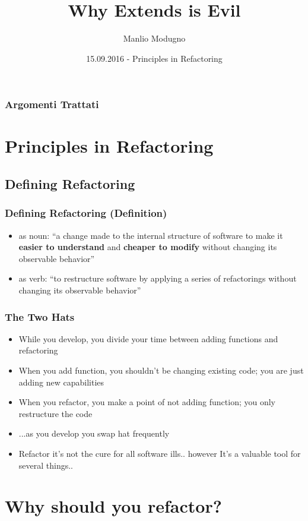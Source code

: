 \documentclass{beamer}
\title{Why Extends is Evil}
\author{Manlio Modugno}
\institute[GMTechnologies]
\date[15.09.2016] 
{15.09.2016 - Principles in Refactoring}
\begin{document}
\begin{frame}
  \titlepage
\end{frame}

\begin{frame}
  \frametitle{Argomenti Trattati}
  \tableofcontents
\end{frame}

\section{Principles in Refactoring}
\subsection{Defining Refactoring}
\begin{frame}
  \frametitle{Defining Refactoring (Definition)}
  \begin{itemize}
	\item<+-> as noun: ``a change made to the internal structure of software to make it 
\textbf{easier to understand} and \textbf{cheaper to modify} without changing its observable behavior''
	\item<+-> as verb: ``to restructure software by applying a series of refactorings without changing its observable behavior''
  \end{itemize}
\end{frame}

\begin{frame}
  \frametitle{The Two Hats}
  \begin{itemize}
  		\item<+-> While you develop, you divide your time between adding functions and refactoring
		\item<+-> When you add function, you shouldn't be changing existing code; you are just adding 
new capabilities
		\item<+-> When you refactor, you make a point of not adding function; you only restructure the code
		\item<+-> ...as you develop you swap hat frequently
		\item<+-> Refactor it's not the cure for all software ills.. however It's a valuable tool for several things.. 		
  \end{itemize}
\end{frame}

\section{Why should you refactor?}
\end{document}
